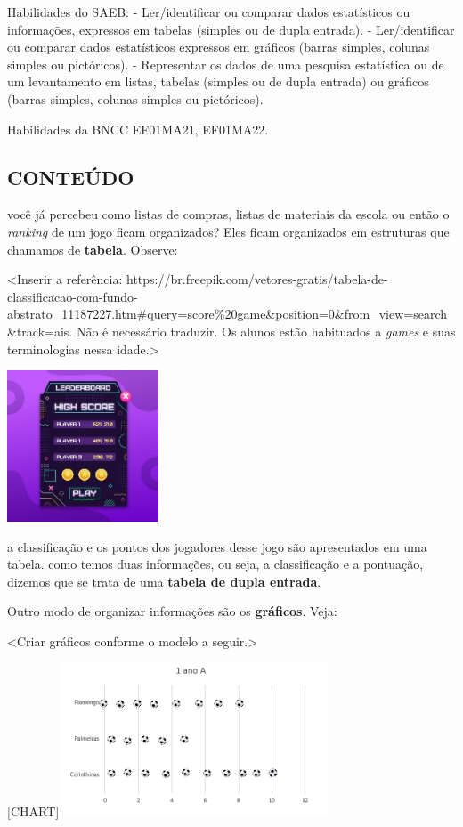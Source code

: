 Habilidades do SAEB:
- Ler/identificar ou comparar dados estatísticos ou informações,
expressos em tabelas (simples ou de dupla entrada).
- Ler/identificar ou comparar dados estatísticos expressos em gráficos
(barras simples, colunas simples ou pictóricos).
- Representar os dados de uma pesquisa estatística ou de um levantamento
em listas, tabelas (simples ou de dupla entrada) ou gráficos (barras
simples, colunas simples ou pictóricos).

Habilidades da BNCC
EF01MA21, EF01MA22.

\subsection{CONTEÚDO}\label{conteuxfado-6}

você já percebeu como listas
de compras, listas de materiais da escola ou então o
\emph{ranking} de um jogo ficam organizados? Eles ficam organizados em estruturas que chamamos de \textbf{tabela}. Observe:

\textless{}Inserir a referência:
https://br.freepik.com/vetores-gratis/tabela-de-classificacao-com-fundo-abstrato\_11187227.htm\#query=score\%20game\&position=0\&from\_view=search\&track=ais.
Não é necessário traduzir. Os alunos estão habituados a \emph{games} e
suas terminologias nessa idade.\textgreater{}

\includegraphics[width=1.77083in,height=1.77083in]{media/image93.jpg}

a classificação e os pontos dos jogadores desse jogo são apresentados em
uma tabela. como temos duas informações, ou seja, a classificação e a
pontuação, dizemos que se trata de uma \textbf{tabela de dupla entrada}.

Outro modo de organizar informações são os \textbf{gráficos}. Veja:

\textless{}Criar gráficos conforme o modelo a seguir.\textgreater{}

{{[}CHART{]}}\includegraphics[width=3.13415in,height=1.79094in]{media/image94.png}


